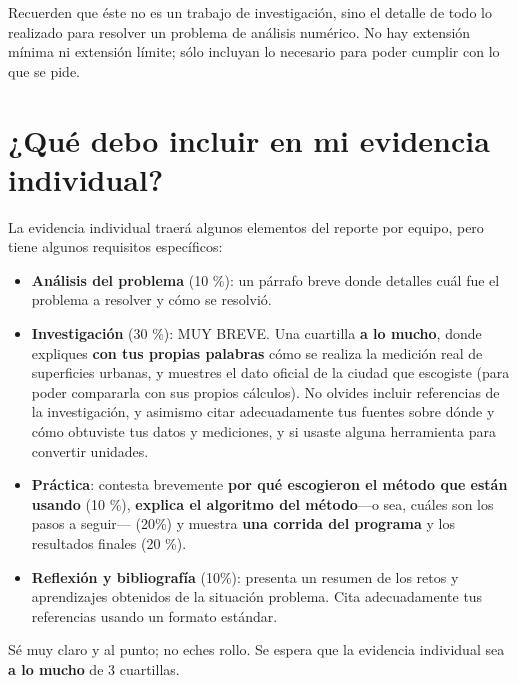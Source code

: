 \documentclass[]{article}
\theoremstyle{definition}
\begin{document}
Recuerden que éste no es un trabajo de investigación, sino el detalle de todo lo realizado para resolver un problema de análisis numérico.
No hay extensión mínima ni extensión límite; sólo incluyan lo necesario para poder cumplir con lo que se pide.

\pagebreak

\section{¿Qué debo incluir en mi evidencia individual?}

La evidencia individual traerá algunos elementos del reporte por equipo, pero tiene algunos requisitos específicos:

\begin{itemize}
    \item \textbf{Análisis del problema} (10 \%): un párrafo breve donde detalles cuál fue el problema a resolver y cómo se resolvió.
    \item \textbf{Investigación} (30 \%): MUY BREVE. Una cuartilla \textbf{a lo mucho}, donde expliques \textbf{con tus propias palabras} cómo se realiza la medición real de superficies urbanas, y muestres el dato oficial de la ciudad que escogiste (para poder compararla con sus propios cálculos). No olvides incluir referencias de la investigación, y asimismo citar adecuadamente tus fuentes sobre dónde y cómo obtuviste tus datos y mediciones, y si usaste alguna herramienta para convertir unidades.
    \item \textbf{Práctica}: contesta brevemente \textbf{por qué escogieron el método que están usando} (10 \%), \textbf{explica el algoritmo del método}---o sea, cuáles son los pasos a seguir--- (20\%) y muestra \textbf{una corrida del programa} y los resultados finales (20 \%).
    \item \textbf{Reflexión y bibliografía} (10\%): presenta un resumen de los retos y aprendizajes obtenidos de la situación problema. Cita adecuadamente tus referencias usando un formato estándar.
\end{itemize}

Sé muy claro y al punto; no eches rollo. Se espera que la evidencia individual sea \textbf{a lo mucho} de 3 cuartillas.
\end{document}
